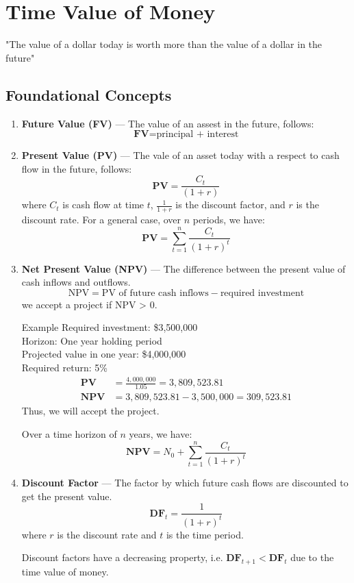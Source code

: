\section{Time Value of Money}
"The value of a dollar today is worth more than the value of a dollar in the future"

\subsection{Foundational Concepts}
\begin{enumerate}[I]
	\item \textbf{Future Value (FV)} — The value of an assest in the future, follows:
		$$
		\textbf{FV} = \text{principal + interest}
		$$
	\item \textbf{Present Value (PV)} — The vale of an asset today with a respect to cash flow in the future, follows:
		$$
		\textbf{PV} = \frac{C_t}{(1 + r)}
		$$
		where $C_t$ is cash flow at time $t$, $\frac{1}{1+r}$ is the discount factor, and $r$ is the discount rate. For a general case, over $n$ periods, we have:
		$$
		\textbf{PV} = \sum_{t=1}^{n} \frac{C_t}{(1 + r)^t}
		$$
	\item \textbf{Net Present Value (NPV)} — The difference between the present value of cash inflows and outflows.
		$$
		\text{NPV} = \text{PV of future cash inflows} - \text{required investment}
		$$
		we accept a project if NPV > 0.
		\begin{examplebox}{Example}
			Required investment: \$3,500,000\\
			Horizon: One year holding period\\
			Projected value in one year: \$4,000,000\\
		  Required return: 5\%
			\begin{align*}
				\textbf{PV} &= \frac{4,000,000}{1.05} = 3,809,523.81\\
				\textbf{NPV} &= 3,809,523.81 - 3,500,000 = 309,523.81
			\end{align*}
			Thus, we will accept the project.
		\end{examplebox}
		Over a time horizon of $n$ years, we have:
		$$
		\textbf{NPV} = N_0 + \sum_{t=1}^{n} \frac{C_t}{(1 + r)^t}
		$$
	\item \textbf{Discount Factor} — The factor by which future cash flows are discounted to get the present value.
		$$
		\textbf{DF}_t = \frac{1}{(1 + r)^t}
		$$
		where $r$ is the discount rate and $t$ is the time period.

		Discount factors have a decreasing property, i.e. $\textbf{DF}_{t+1} < \textbf{DF}_t$ due to the time value of money.


\end{enumerate}
